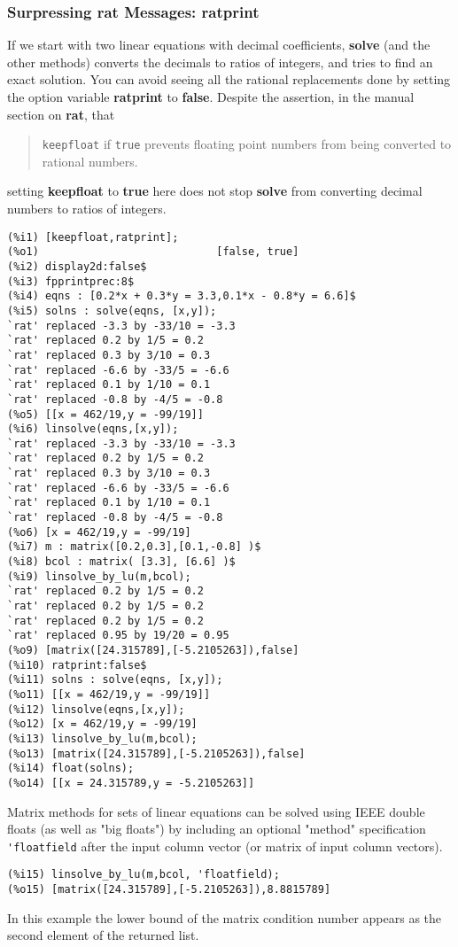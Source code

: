 \documentclass[12pt]{article}
\begin{document}
\subsubsection{Surpressing rat Messages: ratprint}
If we start with two linear equations with decimal coefficients, \textbf{solve} 
  (and the other methods) converts the decimals to ratios of integers, and tries
  to find an exact solution.
You can avoid seeing all the rational replacements done by setting the
  option variable \textbf{ratprint} to \textbf{false}.
Despite the assertion, in the manual section on \textbf{rat}, that
\small
\begin{quote}
\verb|keepfloat| if \verb|true| prevents floating point numbers from being
 converted to rational numbers. 
\end{quote}
\normalsize
setting \textbf{keepfloat} to \textbf{true} here does not stop \textbf{solve} from
  converting decimal numbers to ratios of integers.  
\small
\begin{verbatim}
(%i1) [keepfloat,ratprint];
(%o1)                            [false, true]
(%i2) display2d:false$
(%i3) fpprintprec:8$
(%i4) eqns : [0.2*x + 0.3*y = 3.3,0.1*x - 0.8*y = 6.6]$
(%i5) solns : solve(eqns, [x,y]);
`rat' replaced -3.3 by -33/10 = -3.3
`rat' replaced 0.2 by 1/5 = 0.2
`rat' replaced 0.3 by 3/10 = 0.3
`rat' replaced -6.6 by -33/5 = -6.6
`rat' replaced 0.1 by 1/10 = 0.1
`rat' replaced -0.8 by -4/5 = -0.8
(%o5) [[x = 462/19,y = -99/19]]
(%i6) linsolve(eqns,[x,y]);
`rat' replaced -3.3 by -33/10 = -3.3
`rat' replaced 0.2 by 1/5 = 0.2
`rat' replaced 0.3 by 3/10 = 0.3
`rat' replaced -6.6 by -33/5 = -6.6
`rat' replaced 0.1 by 1/10 = 0.1
`rat' replaced -0.8 by -4/5 = -0.8
(%o6) [x = 462/19,y = -99/19]
(%i7) m : matrix([0.2,0.3],[0.1,-0.8] )$
(%i8) bcol : matrix( [3.3], [6.6] )$
(%i9) linsolve_by_lu(m,bcol);
`rat' replaced 0.2 by 1/5 = 0.2
`rat' replaced 0.2 by 1/5 = 0.2
`rat' replaced 0.2 by 1/5 = 0.2
`rat' replaced 0.95 by 19/20 = 0.95
(%o9) [matrix([24.315789],[-5.2105263]),false]
(%i10) ratprint:false$
(%i11) solns : solve(eqns, [x,y]);
(%o11) [[x = 462/19,y = -99/19]]
(%i12) linsolve(eqns,[x,y]);
(%o12) [x = 462/19,y = -99/19]
(%i13) linsolve_by_lu(m,bcol);
(%o13) [matrix([24.315789],[-5.2105263]),false]
(%i14) float(solns);
(%o14) [[x = 24.315789,y = -5.2105263]]
\end{verbatim}
\normalsize
Matrix methods for sets of linear equations can be solved using IEEE double floats
  (as well as "big floats") by including an optional "method" specification \verb|'floatfield| 
  after the input column vector (or matrix of input column vectors).
\small
\begin{verbatim}
(%i15) linsolve_by_lu(m,bcol, 'floatfield);
(%o15) [matrix([24.315789],[-5.2105263]),8.8815789]
\end{verbatim}
\normalsize
In this example the lower bound of the matrix condition number appears as
  the second element of the returned list.
\end{document}
